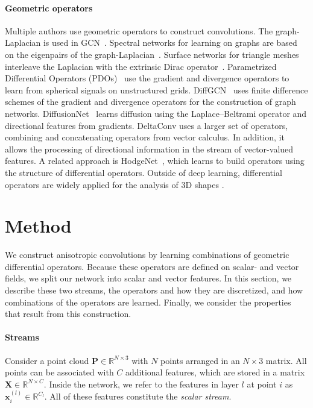 \documentclass[acmtog, authorversion]{acmart}
\begin{document}
\paragraph*{Geometric operators} 
Multiple authors use geometric operators to construct convolutions. The graph-Laplacian is used in GCN~\cite{kipf2017}. Spectral networks for learning on graphs are based on the eigenpairs of the graph-Laplacian~\cite{Bruna2013}. 
Surface networks for triangle meshes~\cite{Kostrikov2018} interleave the Laplacian with the extrinsic Dirac operator~\cite{liu2017dirac}.
Parametrized Differential Operators (PDOs)~\cite{jiang2018spherical} use the gradient and divergence operators to learn from spherical signals on unstructured grids.
DiffGCN~\cite{Eliasof2020} uses finite difference schemes of the gradient and divergence operators for the construction of graph networks.
DiffusionNet~\cite{Sharp2020DiffusionIA} learns diffusion using the Laplace--Beltrami operator and directional features from gradients. DeltaConv uses a larger set of operators, combining and concatenating operators from vector calculus. In addition, it allows the processing of directional information in the stream of vector-valued features. A related approach is HodgeNet~\cite{smirnov2021hodgenet}, which learns to build operators using the structure of differential operators.
Outside of deep learning, differential operators are widely applied for the analysis of 3D shapes \cite{Crane2013DGP,Goes2015}.
 \section{Method}
We construct anisotropic convolutions by learning combinations of geometric differential operators. Because these operators are defined on scalar- and vector fields, we split our network into scalar and vector features. In this section, we describe these two streams, the operators and how they are discretized, and how combinations of the operators are learned. Finally, we consider the properties that result from this construction.

\paragraph*{Streams} Consider a point cloud $\mathbf{P} \in \mathbb{R}^{N \times 3}$ with $N$ points arranged in an $N \times 3$ matrix. All points can be associated with $C$ additional features, which are stored in a matrix $\mathbf{X} \in \mathbb{R}^{N \times C}$. Inside the network, we refer to the features in layer $l$ at point $i$ as $\mathbf{x}_i^{(l)} \in \mathbb{R}^{C_l}$. All of these features constitute the \textit{scalar stream}.
\end{document}
